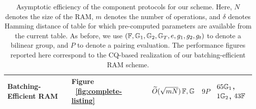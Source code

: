\begin{table}[bt]
\begin{tabular}{l|l|l|l|l}
        \rowcolor{lightgray}
        {Batching-Efficient RAM}                                                                          & {Figure  ~\ref{fig:complete-listing}}    & {$\widetilde{O}(\sqrt{mN})\,\mathbb{F},\mathbb{G}$}            & ${9P}$            & {$65\mathbb{G}_1$, $1\mathbb{G}_2$, $43\mathbb{F}$}  \\ \hline
    \end{tabular}
    \caption{Asymptotic efficiency of the component protocols for our scheme. Here, $N$ denotes the size of the RAM, $m$ denotes the number of operations,
    and $\delta$ denotes Hamming distance of table for which pre-computed parameters are available from the current table. As before, we use $(\mathbb{F},\mathbb{G}_1,\mathbb{G}_2,\mathbb{G}_T, e, g_1, g_2,g_t)$ to denote a bilinear group, and $P$ to denote a pairing evaluation. The performance figures reported here correspond to the CQ-based realization of our batching-efficient RAM scheme.}
    \label{tbl:efficiency-components}
    \vspace*{-5mm}
\end{table}



